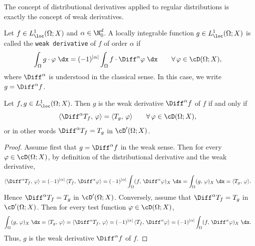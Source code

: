 The concept of distributional derivatives applied to regular distributions is exactly the concept of weak derivatives.

\begin{definition}
	Let $f\in L^1_{\loc}(\Omega;X)$ and $\alpha\in\N_0^d$.
	A locally integrable function $g\in L^1_{\loc}(\Omega;X)$ is called the {\tt weak derivative} of $f$ of order $\alpha$ if
	\begin{equation*}
		\int_\Omega g\cdot \varphi\;\dx =
		(-1)^{|\alpha|}\int_\Omega f\cdot \Diff^\alpha\varphi\;\dx\qquad \forall\,\varphi\in\cD(\Omega;X),
	\end{equation*}
	where $\Diff^\alpha$ is understood in the classical sense. In this case, we write $g=\Diff^\alpha f$.
\end{definition}

\begin{proposition}
	Let $f,g\in L^1_\loc(\Omega;X)$. Then $g$ is the weak derivative $\Diff^\alpha f$ of $f$ if and only if
	\begin{equation*}
		\langle \Diff^\alpha T_f,\,\varphi\rangle = \langle T_g,\,\varphi\rangle\qquad\forall\,\varphi\in\cD(\Omega;X),
	\end{equation*}
	or in other words $\Diff^\alpha T_f = T_g$ in $\cD^\prime(\Omega;X)$.
\end{proposition}
\begin{proof}
	Assume first that $g=\Diff^\alpha f$ in the weak sense. Then for every $\varphi\in\cD(\Omega;X)$, by definition of the distributional derivative and the weak derivative,
	\begin{equation*}
		\langle \Diff^\alpha T_f,\,\varphi\rangle = (-1)^{|\alpha|}\,\langle T_f,\,\Diff^\alpha\varphi\rangle  = (-1)^{|\alpha|}\int_\Omega (f,\,\Diff^\alpha\varphi)_X\;\dx = \int_\Omega (g,\,\varphi)_X\;\dx  = \langle T_g,\,\varphi\rangle.
	\end{equation*}
	Hence $\Diff^\alpha T_f = T_g$ in $\cD^\prime(\Omega;X)$. Conversely, assume that $\Diff^\alpha T_f = T_g$ in $\cD^\prime(\Omega;X)$. Then for every test function $\varphi\in\cD(\Omega;X)$,
	\begin{equation*}
		\int_\Omega (g,\,\varphi)_X\;\dx = \langle T_g,\,\varphi\rangle  =\langle \Diff^\alpha T_f,\,\varphi\rangle  =(-1)^{|\alpha|}\,\langle T_f,\,\Diff^\alpha\varphi\rangle  = (-1)^{|\alpha|}\int_\Omega (f,\,\Diff^\alpha\varphi)_X\;\dx.
	\end{equation*}
	Thus, $g$ is the weak derivative $\Diff^\alpha f$ of $f$.
\end{proof}

